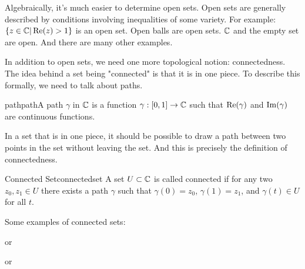 Algebraically, it's much easier to determine open sets. Open sets are generally described by conditions involving inequalities of some variety. For example: $\{z\in \mathbb{C}| \operatorname{Re}(z) > 1\}$ is an open set. Open balls are open sets. $\mathbb{C}$ and the empty set are open. And there are many other examples.

In addition to open sets, we need one more topological notion: connectedness. The idea behind a set being "connected" is that it is in one piece. To describe this formally, we need to talk about paths.

\begin{defbo}{path}{path}A path $\gamma$ in $\mathbb{C}$ is a function $\gamma:[0,1] \rightarrow \mathbb{C}$ such that $\operatorname{Re}(\gamma)$ and $\operatorname{Im}(\gamma)$ are continuous functions.\end{defbo}

In a set that is in one piece, it should be possible to draw a path between two points in the set without leaving the set. And this is precisely the definition of connectedness.

\begin{defbo}{Connected Set}{connectedset} A set $U\subset \mathbb{C}$ is called connected if for any two $z_0,z_1\in U$ there exists a path $\gamma$ such that $\gamma(0) = z_0$, $\gamma(1) = z_1$, and $\gamma(t)\in U$ for all $t$.\end{defbo}

Some examples of connected sets:

\begin{center}
\qquad or \qquad
{}
\qquad or \qquad
{}

\end{center}

